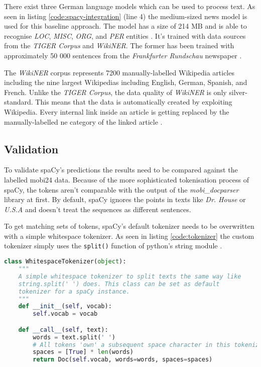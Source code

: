 There exist three German language models which can be used to process text. As seen in listing \ref{code:spacy-integration} (line 4) the medium-sized news model is used for this baseline approach. The model has a size of 214 MB and is able to recognise \emph{LOC}, \emph{MISC}, \emph{ORG}, and \emph{PER} entities \cite{gh-spacy}. It's trained with data sources from the \emph{TIGER Corpus} and \emph{WikiNER}. The former has been trained with approximately 50 000 sentences from the \emph{Frankfurter Rundschau} newspaper \cite{tiger}.

The \emph{WikiNER} corpus represents 7200 manually-labelled Wikipedia articles including the nine largest Wikipedias including English, German, Spanish, and French. Unlike the \emph{TIGER Corpus}, the data quality of \emph{WikiNER} is only silver-standard. This means that the data is automatically created by exploiting Wikipedia. Every internal link inside an article is getting replaced by the manually-labelled \acrshort{ne} category of the linked article \cite{Nothman}.

\subsection{Validation}

To validate spaCy's predictions the results need to be compared against the labelled \gls{mobi24} data. Because of the more sophisticated tokenisation process of spaCy, the tokens aren't comparable with the output of the \emph{mobi\_docparser} library at first. By default, spaCy ignores the points in texts like \emph{Dr. House} or \emph{U.S.A} and doesn't treat the sequences as different sentences.

To get matching sets of tokens, spaCy's default tokenizer needs to be overwritten with a simple whitespace tokenizer. As seen in listing \ref{code:tokenizer} the custom tokenizer simply uses the \verb|split()| function of python's string module \cite{spacy-tok}.

\begin{lstlisting}[language=Python, label={code:tokenizer}, caption=Custom whitespace tokenizer]
class WhitespaceTokenizer(object):
    """
    A simple whitespace tokenizer to split texts the same way like
    string.split(' ') does. This class can be set as default
    tokenizer for a spaCy instance.
    """
    def __init__(self, vocab):
        self.vocab = vocab

    def __call__(self, text):
        words = text.split(' ')
        # All tokens 'own' a subsequent space character in this tokenizer
        spaces = [True] * len(words)
        return Doc(self.vocab, words=words, spaces=spaces)
\end{lstlisting}


